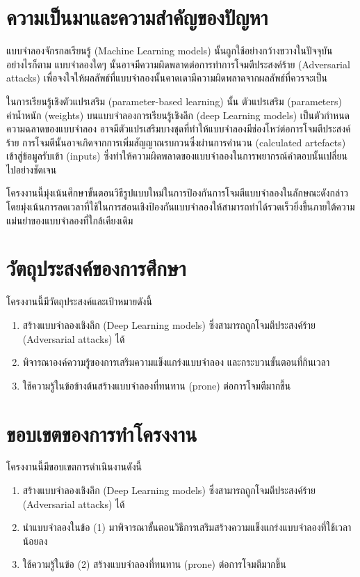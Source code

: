 \section{ความเป็นมาและความสําคัญของปัญหา}

แบบจำลองจักรกลเรียนรู้ (Machine Learning models) นั้นถูกใช้อย่างกว้างขวางในปัจจุบัน อย่างไรก็ตาม แบบจำลองใดๆ นั้นอาจมีความผิดพลาดต่อการทำการโจมตีประสงค์ร้าย (Adversarial attacks) เพื่อจงใจให้ผลลัพธ์ที่แบบจำลองนั้นคาดเดามีความผิดพลาดจากผลลัพธ์ที่ควรจะเป็น

ในการเรียนรู้เชิงตัวแปรเสริม (parameter-based learning) นั้น ตัวแปรเสริม (parameters) ค่าน้ำหนัก (weights) บนแบบจำลองการเรียนรู้เชิงลึก (deep Learning models) เป็นตัวกำหนดความฉลาดของแบบจำลอง อาจมีตัวแปรเสริมบางชุดที่ทำให้แบบจำลองมีช่องโหว่ต่อการโจมตีประสงค์ร้าย การโจมตีนั้นอาจเกิดจากการเพิ่มสัญญาณรบกวนซึ่งผ่านการคำนวน (calculated artefacts) เข้าสู่ข้อมูลรับเข้า (inputs) ซึ่งทำให้ความผิดพลาดของแบบจำลองในการพยากรณ์คำตอบนั้นเปลี่ยนไปอย่างชัดเจน 

โครงงานนี้มุ่งเน้นศึกษาขั้นตอนวิธีรูปแบบใหม่ในการป้องกันการโจมตีแบบจำลองในลักษณะดังกล่าว โดยมุ่งเน้นการลดเวลาที่ใช้ในการสอนเชิงป้องกันแบบจำลองให้สามารถทำได้รวดเร็วยิ่งขึ้นภายใต้ความแม่นยำของแบบจำลองที่ใกล้เคียงเดิม

\section{วัตถุประสงค์ของการศึกษา}
\noindent
โครงงานนี้มีวัตถุประสงค์และเป้าหมายดังนี้

\begin{enumerate}
    \item สร้างแบบจำลองเชิงลึก (Deep Learning models) ซึ่งสามารถถูกโจมตีประสงค์ร้าย (Adversarial attacks) ได้
    \item พิจารณาองค์ความรู้ของการเสริมความแข็งแกร่งแบบจำลอง และกระบวนขั้นตอนที่กินเวลา
    \item ใช้ความรู้ในข้อข้างต้นสร้างแบบจำลองที่ทนทาน (prone) ต่อการโจมตีมากขึ้น
\end{enumerate}

\section{ขอบเขตของการทําโครงงาน}
\noindent
โครงงานนี้มีขอบเขตการดำเนินงานดังนี้

\begin{enumerate}
    \item สร้างแบบจำลองเชิงลึก (Deep Learning models) ซึ่งสามารถถูกโจมตีประสงค์ร้าย (Adversarial attacks) ได้
    \item นำแบบจำลองในข้อ (1) มาพิจารณาขั้นตอนวิธีการเสริมสร้างความแข็งแกร่งแบบจำลองที่ใช้เวลาน้อยลง
    \item ใช้ความรู้ในข้อ (2) สร้างแบบจำลองที่ทนทาน (prone) ต่อการโจมตีมากขึ้น
\end{enumerate}

